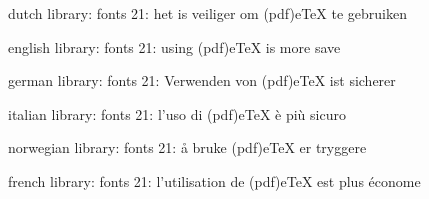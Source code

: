 


\startmessages  dutch  library: fonts
     21: het is veiliger om (pdf)eTeX te gebruiken
\stopmessages

\startmessages  english  library: fonts
     21: using (pdf)eTeX is more save
\stopmessages

\startmessages  german  library: fonts
     21: Verwenden von (pdf)eTeX ist sicherer
\stopmessages

\startmessages  italian  library: fonts
     21: l'uso di (pdf)eTeX è  più sicuro
\stopmessages

\startmessages  norwegian  library: fonts
     21: å bruke (pdf)eTeX er tryggere
\stopmessages

\startmessages  french  library: fonts
     21: l'utilisation de (pdf)eTeX est plus économe
\stopmessages

\unprotect

